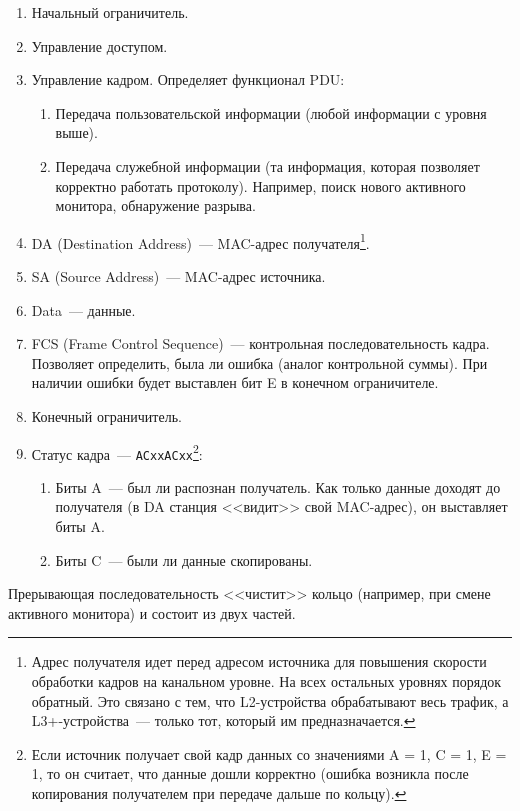 \begin{enumerate}
    \item Начальный ограничитель.
    \item Управление доступом.
    \item Управление кадром. Определяет функционал PDU:
          \begin{enumerate}
              \item Передача пользовательской информации (любой информации с уровня выше).
              \item Передача служебной информации (та информация, которая позволяет корректно работать протоколу). Например, поиск нового активного монитора, обнаружение разрыва.
          \end{enumerate}
    \item DA (Destination Address)~--- MAC-адрес получателя\footnote{Адрес получателя
              идет перед адресом источника для повышения скорости обработки кадров на
              канальном уровне. На всех остальных уровнях порядок обратный. Это связано с
              тем, что L2-устройства обрабатывают весь трафик, а L3+-устройства~--- только
              тот, который им предназначается.}.
    \item SA (Source Address)~--- MAC-адрес источника.
    \item Data~--- данные.
    \item FCS (Frame Control Sequence)~--- контрольная последовательность кадра.
          Позволяет определить, была ли ошибка (аналог контрольной суммы). При наличии
          ошибки будет выставлен бит E в конечном ограничителе.
    \item Конечный ограничитель.
    \item Статус кадра~--- \texttt{ACxxACxx}\footnote{Если источник получает свой кадр данных со значениями A = 1, C = 1, E = 1, то он считает, что данные дошли корректно (ошибка возникла после копирования получателем при передаче дальше по кольцу).}:
          \begin{enumerate}
              \item Биты A~--- был ли распознан получатель. Как только данные доходят до получателя (в DA станция <<видит>> свой MAC-адрес), он выставляет биты A.
              \item Биты C~--- были ли данные скопированы.
          \end{enumerate}
\end{enumerate}

Прерывающая последовательность <<чистит>> кольцо (например, при смене активного монитора) и состоит из двух частей.

